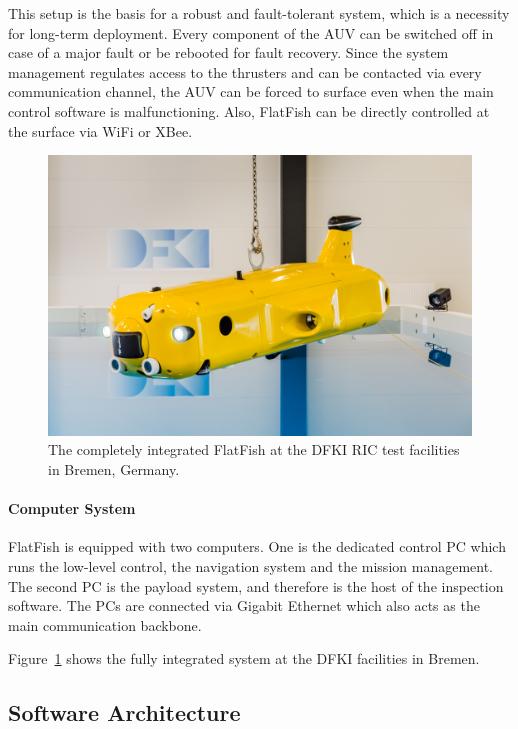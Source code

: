 \documentclass[conference]{IEEEtran}
\begin{document}
This setup is the basis for a robust and fault-tolerant system, which is a necessity for 
long-term deployment. Every component of the AUV can be switched off in case of a 
major fault or be rebooted for fault recovery. Since the system management regulates 
access to the thrusters and can be contacted via every communication channel, the AUV 
can be forced to surface even when the main control software is malfunctioning. Also, FlatFish can be directly controlled at the surface via WiFi or XBee.

\begin{figure}[!t]
	\centering
	\includegraphics[width=0.9\columnwidth]{FlatFish-1.jpg}
	\caption{The completely integrated FlatFish at the DFKI RIC test facilities in Bremen, 
	Germany.}
	\label{fig:flatfish1}
\end{figure}

\paragraph{\textbf{Computer System}} FlatFish is equipped with two computers. 
One is the dedicated control PC which runs the low-level control, the navigation system 
and the mission management. The second PC is the payload system, and therefore is the 
host of the inspection software. The PCs are connected via Gigabit Ethernet which also acts 
as the main communication backbone.

Figure~\ref{fig:flatfish1} shows the fully integrated system at the DFKI facilities in Bremen.

\subsection{Software Architecture}
\end{document}
